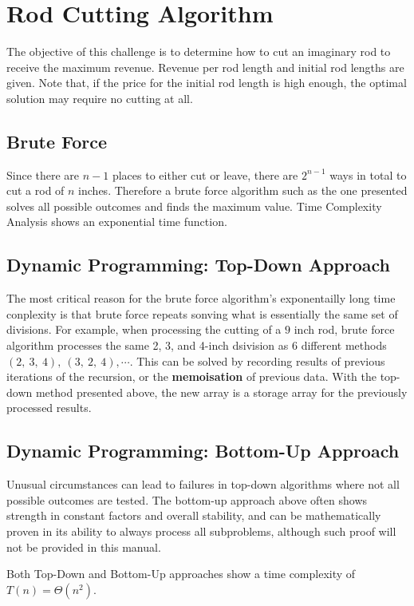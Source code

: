 \chapter{Rod Cutting Algorithm}
The objective of this challenge is to determine how to cut an imaginary rod to
receive the maximum revenue. Revenue per rod length and initial rod lengths are
given. Note that, if the price for the initial rod length is high enough, the
optimal solution may require no cutting at all.

\section{Brute Force}

Since there are $n-1$ places to either cut or leave, there are $2^{n-1}$ ways in
total to cut a rod of $n$ inches. Therefore a brute force algorithm such as the
one presented solves all possible outcomes and finds the maximum value. Time
Complexity Analysis shows an exponential time function.

\section{Dynamic Programming: Top-Down Approach}

The most critical reason for the brute force algorithm's exponentailly long time
conplexity is that brute force repeats sonving what is essentially the same set
of divisions. For example, when processing the cutting of a $9$ inch rod, brute
force algorithm processes the same 2, 3, and 4-inch dsivision as 6 different
methods $(2,~3,~4),~(3,~2,~4),\cdots$. This can be solved by recording results
of previous iterations of the recursion, or the \textbf{memoisation} of previous
data. With the top-down method presented above, the new array  is
a storage array for the previously processed results.

\section{Dynamic Programming: Bottom-Up Approach}

Unusual circumstances can lead to failures in top-down algorithms where not all
possible outcomes are tested. The bottom-up approach above often shows strength
in constant factors and overall stability, and can be mathematically proven in
its ability to always process all subproblems, although such proof will not be
provided in this manual.

Both Top-Down and Bottom-Up approaches show a time complexity of $T(n)=\Theta
\left(n^2\right)$.
